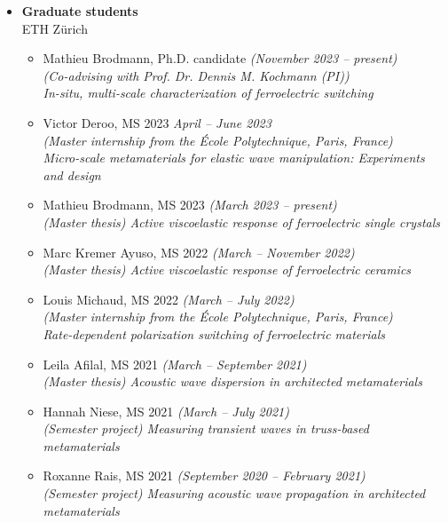 \documentclass[a4paper,10pt, oneside]{article}
\begin{document}
	\begin{itemize}[wide, labelwidth=!, labelindent=-1em]
		\item[]\textbf{Graduate students} \\
		ETH Z\"{u}rich
		\begin{itemize}[wide, labelwidth=!, labelindent=0em]
			\item Mathieu Brodmann, Ph.D. candidate \hfill \textit{(November 2023 -- present)} \\
			\textit{(Co-advising with Prof. Dr. Dennis M. Kochmann (PI))}\\ 
			\textit{In-situ, multi-scale characterization of ferroelectric switching}
			\item Victor Deroo, MS 2023 \hfill \textit{April -- June 2023} \\
			\textit{(Master internship from the \'{E}cole Polytechnique, Paris, France) \\
				Micro-scale metamaterials for elastic wave manipulation: Experiments and design}
			\item Mathieu Brodmann, MS 2023 \hfill \textit{(March 2023 -- present)} \\
			\textit{(Master thesis) Active viscoelastic response of ferroelectric single crystals}
			\item Marc Kremer Ayuso, MS 2022 \hfill \textit{(March -- November 2022)} \\
			\textit{(Master thesis) Active viscoelastic response of ferroelectric ceramics}
			\item Louis Michaud, MS 2022  \hfill \textit{(March -- July 2022)} \\
			\textit{(Master internship from the \'{E}cole Polytechnique, Paris, France) \\
				Rate-dependent polarization switching of ferroelectric materials}
			\item Leila Afilal, MS 2021  \hfill \textit{(March -- September 2021)} \\
			\textit{(Master thesis) Acoustic wave dispersion in architected metamaterials}
			\item Hannah Niese, MS 2021  \hfill \textit{(March -- July 2021)} \\
			\textit{(Semester project) Measuring transient waves in truss-based metamaterials}
			\item Roxanne Rais, MS 2021  \hfill \textit{(September 2020 -- February 2021)} \\
			\textit{(Semester project) Measuring acoustic wave propagation in architected metamaterials}

\end{itemize}
\end{itemize}
\end{document}
